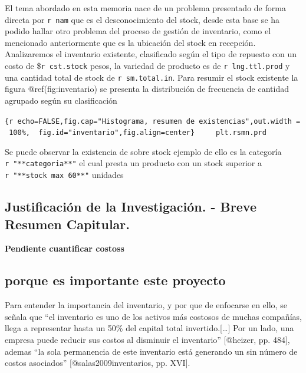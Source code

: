 \documentclass[11pt]{article}
\begin{document}
El tema abordado en esta memoria nace de un problema presentado de forma
directa por \texttt{r\ nam} que es el desconocimiento del stock, desde
esta base se ha podido hallar otro problema del proceso de gestión de
inventario, como el mencionado anteriormente que es la ubicación del
stock en recepción. Analizaremos el inventario existente, clasificado
según el tipo de repuesto con un costo de \$\texttt{r\ cst.stock} pesos,
la variedad de producto es de \texttt{r\ lng.ttl.prod} y una cantidad
total de stock de \texttt{r\ sm.total.in}. Para resumir el stock
existente la figura @ref(fig:inventario) se presenta la distribución de
frecuencia de cantidad agrupado según su clasificación

\texttt{\{r\ echo=FALSE,fig.cap="Histograma,\ resumen\ de\ existencias",out.width\ =\ \textquotesingle{}100\%\textquotesingle{},\ \ fig.id="inventario",fig.align=\textquotesingle{}center\textquotesingle{}\}\ \ \ \ \ plt.rsmn.prd}

Se puede observar la existencia de sobre stock ejemplo de ello es la
categoría \texttt{r\ "**categoria**"} el cual presta un producto con un
stock superior a \texttt{r\ "**stock\ max\ 60**"} unidades

\hypertarget{justificaciuxf3n-de-la-investigaciuxf3n.---breve-resumen-capitular.}{%
\subsection{Justificación de la Investigación. - Breve Resumen
Capitular.}\label{justificaciuxf3n-de-la-investigaciuxf3n.---breve-resumen-capitular.}}

\textbf{Pendiente cuantificar costoss }

\hypertarget{porque-es-importante-este-proyecto}{%
\subsection{porque es importante este
proyecto}\label{porque-es-importante-este-proyecto}}

Para entender la importancia del inventario, y por que de enfocarse en
ello, se señala que ``el inventario es uno de los activos más costosos
de muchas compañías, llega a representar hasta un 50\% del capital total
invertido.{[}\ldots{}{]} Por un lado, una empresa puede reducir sus
costos al disminuir el inventario'' {[}@heizer, pp. 484{]}, ademas ``la
sola permanencia de este inventario está generando un sin número de
costos asociados'' {[}@salas2009inventarios, pp. XVI{]}.
\end{document}
